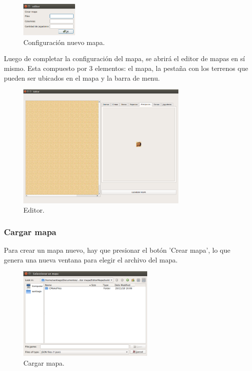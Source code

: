 \documentclass[titlepage,a4paper,12pt]{article}
\begin{document}
\begin{figure}[H]
	\centering
	\includegraphics[width=0.25\textwidth]{../imagenes/conf_nuevo_mapa.png}
	\caption{\label{fig:menu_editor} Configuración nuevo mapa.}
\end{figure}

Luego de completar la configuración del mapa, se abrirá el editor de mapas en sí mismo. Esta compuesto por 3 elementos: el mapa, la pestaña con los terrenos que pueden ser ubicados en el mapa y la barra de menu.\\

\begin{figure}[H]
	\centering
	\includegraphics[width=0.75\textwidth]{../imagenes/editor_ui.png}
	\caption{\label{fig:menu_editor} Editor.}
\end{figure}

\subsubsection{Cargar mapa}

Para crear un mapa nuevo, hay que presionar el botón 'Crear mapa', lo que genera una nueva ventana para elegir el archivo del mapa.\\

\begin{figure}[H]
	\centering
	\includegraphics[width=0.6\textwidth]{../imagenes/cargar_mapa.png}
	\caption{\label{fig:menu_editor} Cargar mapa.}
\end{figure}
\end{document}
